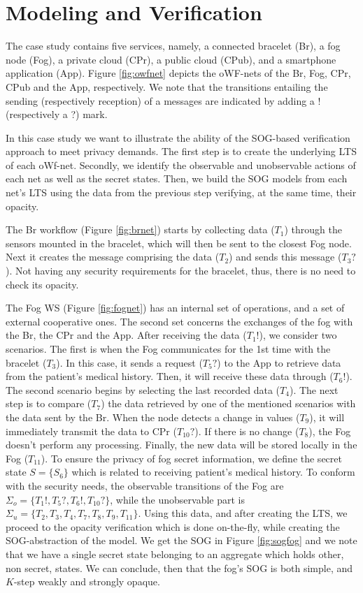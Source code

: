 \section{Modeling and Verification}
The case study contains five services, namely, a connected bracelet (Br), a fog node (Fog), a private cloud (CPr), a public cloud (CPub), and a smartphone application (App). Figure \ref{fig:owfnet} depicts the oWF-nets of the Br, Fog, CPr, CPub and the App, respectively. We note that the transitions entailing the sending (respectively reception) of a messages are indicated by adding a ! (respectively a ?) mark.

In this case study we want to illustrate the ability of the SOG-based verification approach to meet privacy demands. The first step is to create the underlying LTS of each oWf-net. Secondly, we identify the observable and unobservable actions of each net as well as the secret states. Then, we build the SOG models from each net’s LTS using the data from the previous step verifying, at the same time, their opacity.

The Br workflow (Figure \ref{fig:brnet}) starts by collecting data ($T_1$) through the sensors mounted in the bracelet, which will then be sent to the closest Fog node. Next it creates the message comprising the data ($T_2$) and sends this message ($T_3?$). Not having any security requirements for the bracelet, thus, there is no need to check its opacity.

The Fog WS (Figure \ref{fig:fognet}) has an internal set of operations, and a set of external cooperative ones. The second set concerns the exchanges of the fog with the Br, the CPr and the App. After receiving the data ($T_1!$), we consider two scenarios. The first is when the Fog communicates for the 1st time with the bracelet ($T_3$). In this case, it sends a request ($T_5?$) to the App to retrieve data from the patient's medical history. Then, it will receive these data through ($T_6!$). The second scenario begins by selecting the last recorded data ($T_4$). The next step is to compare ($T_7$) the data retrieved by one of the mentioned scenarios with the data sent by the Br. When the node detects a change in values ($T_9$), it will immediately transmit the data to CPr ($T_{10}?$). If there is no change ($T_8$), the Fog doesn't perform any processing. Finally, the new data will be stored locally in the Fog ($T_{11}$). To ensure the
privacy of fog secret information, we define the secret state $S=\{S_6\}$ which is related to receiving patient's medical history. To conform with the security needs, the observable transitions of the Fog are $\Sigma_{o} = \{T_1!,T_5?,T_6!,T_{10}?\}$, while
the unobservable part is $\Sigma_{u}=\{T_2,T_3,T_4,T_7,T_8,T_9,T_{11}\}$. Using this data, and after creating the LTS, we proceed to the opacity verification which is done on-the-ﬂy, while creating the SOG-abstraction of the model. We get the SOG in Figure \ref{fig:sogfog} and we note that we have a single secret state belonging to an aggregate which holds other, non secret, states. We can conclude, then that the fog's SOG is both simple, and $K$-step weakly and strongly opaque.


